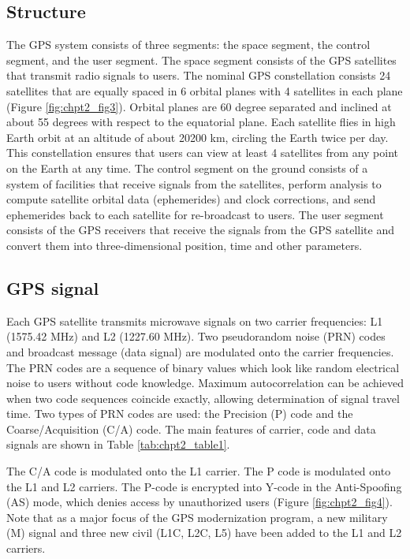 \subsection{Structure}
The GPS system consists of three segments: the space segment, the control segment, and the user segment.  The space segment consists of the GPS satellites that transmit radio signals to users.  The nominal GPS constellation consists 24 satellites that are equally spaced in 6 orbital planes with 4 satellites in each plane (Figure \ref{fig:chpt2_fig3}).  Orbital planes are 60 degree separated and inclined at about 55 degrees with respect to the equatorial plane.  Each satellite flies in high Earth orbit at an altitude of about 20200 km, circling the Earth twice per day.  This constellation ensures that users can view at least 4 satellites from any point on the Earth at any time. The control segment on the ground consists of a system of facilities that receive signals from the satellites, perform analysis to compute satellite orbital data (ephemerides) and clock corrections, and send ephemerides back to each satellite for re-broadcast to users.  The user segment consists of the GPS receivers that receive the signals from the GPS satellite and convert them into three-dimensional position, time and other parameters.  

\subsection{GPS signal}
Each GPS satellite transmits microwave signals on two carrier frequencies: L1 (1575.42 MHz) and L2 (1227.60 MHz).  Two pseudorandom noise (PRN) codes and broadcast message (data signal) are modulated onto the carrier frequencies.  The PRN codes are a sequence of binary values which look like random electrical noise to users without code knowledge.  Maximum autocorrelation can be achieved when two code sequences coincide exactly, allowing determination of signal travel time.   Two types of PRN codes are used: the Precision (P) code and the Coarse/Acquisition (C/A) code.  The main features of carrier, code and data signals are shown in Table \ref{tab:chpt2_table1}. 

The C/A code is modulated onto the L1 carrier. The P code is modulated onto the L1 and L2 carriers.  The P-code is encrypted into Y-code in the Anti-Spoofing (AS) mode, which denies access by unauthorized users (Figure \ref{fig:chpt2_fig4}).  Note that as a major focus of the GPS modernization program, a new military (M) signal and three new civil (L1C, L2C, L5) have been added to the L1 and L2 carriers. 

